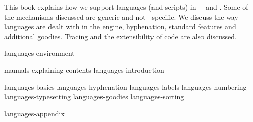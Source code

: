 
%

\enablemode[simple] %

\startbuffer[abstract]

    This book explains how we support languages (and scripts) in \CONTEXT\ \MKIV\
    and \LUATEX. Some of the mechanisms discussed are generic and not \CONTEXT\
    specific. We discuss the way languages are dealt with in the engine,
    hyphenation, standard features and additional goodies. Tracing and the
    extensibility of code are also discussed.

\stopbuffer

\environment languages-environment

\startdocument
  [author=Hans Hagen,
   title=Languages in \ConTeXt,
   subtitle=explaining luatex and mkiv,
   affiliation=PRAGMA ADE,
   comment=work in progress,
   cover:color:1=darkmagenta,
   cover:color:2=darkorange,
   cover:color:3=darkyellow,
   cover:color:4=darkcyan,
   cover:color:5=darkgray]

    \startfrontmatter
        \component manuals-explaining-contents
        \component languages-introduction
    \stopfrontmatter

    \startbodymatter
        \component languages-basics
        \component languages-hyphenation
        \component languages-labels
        \component languages-numbering
        \component languages-typesetting
        \component languages-goodies
        \component languages-sorting
    \stopbodymatter

    \startappendices
        \component languages-appendix
    \stopappendices

\stopdocument
